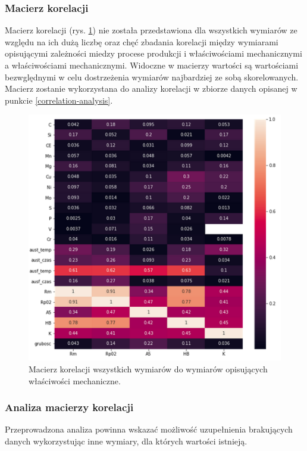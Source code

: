 \subsubsection{Macierz korelacji}
Macierz korelacji (rys. \ref{fig:correlation}) nie została przedstawiona dla wszystkich wymiarów ze względu na ich dużą liczbę oraz chęć zbadania korelacji między wymiarami opisującymi zależności miedzy procese produkcji i właściwościami mechanicznymi a właściwościami mechanicznymi. Widoczne w macierzy wartości są wartościami bezwględnymi w celu dostrzeżenia wymiarów najbardziej ze sobą skorelowanych. Macierz zostanie wykorzystana do analizy korelacji w zbiorze danych opisanej w punkcie \ref{correlation-analysis}.
\begin{figure}[ht]{}
	\centering
	\includegraphics[scale=0.6]{images/correlation.png}
	\caption {
		 Macierz korelacji wszystkich wymiarów do wymiarów opisujących właściwości mechaniczne.
	}
	\label{fig:correlation}
\end{figure}
\FloatBarrier

\subsubsection{Analiza macierzy korelacji}
Przeprowadzona analiza powinna wskazać możliwość uzupełnienia brakujących danych wykorzystując inne wymiary, dla których wartości istnieją. 

